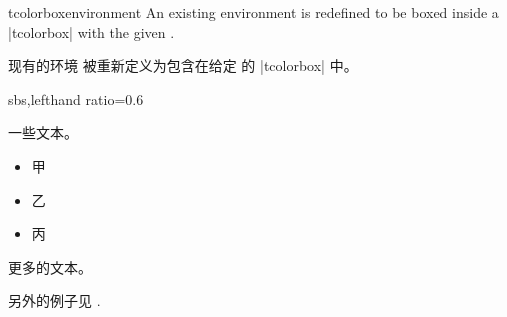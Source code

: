 
\begin{docCommand}[doc new=2014-10-20]{tcolorboxenvironment}{}
An existing environment  is redefined to be boxed inside a
|tcolorbox| with the given .


现有的环境  被重新定义为包含在给定  的 |tcolorbox| 中。
\begin{dispExample*}{sbs,lefthand ratio=0.6}
\newenvironment{myitemize}{%
  \begin{itemize}}{\end{itemize}}


一些文本。
\begin{myitemize}
\item 甲
\item 乙
\item 丙
\end{myitemize}
更多的文本。
\end{dispExample*}

\medskip
另外的例子见 .
\end{docCommand}

